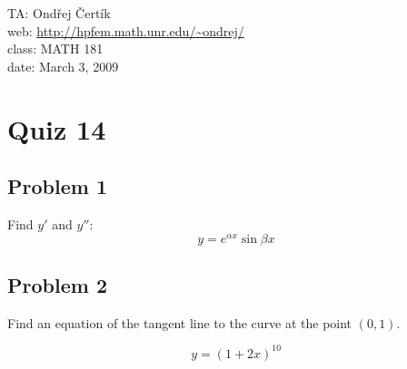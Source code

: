 \documentclass[10pt]{article}
\begin{document}
\noindent TA: Ondřej Čertík\\
web: \url{http://hpfem.math.unr.edu/~ondrej/}\\
class: MATH 181\\
date: March 3, 2009

\section*{Quiz 14}

\subsection*{Problem 1}

Find $y'$ and $y''$:
$$y=e^{\alpha x} \sin \beta x$$

\subsection*{Problem 2}

Find an equation of the tangent line to the curve at the point $(0, 1)$.

$$y=(1+2x)^10$$
\end{document}
